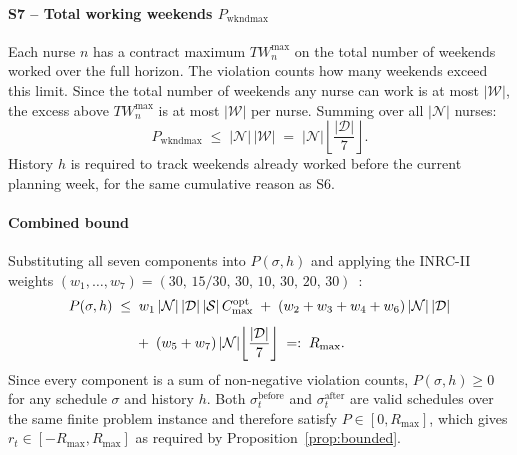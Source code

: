 \documentclass[11pt]{article}
\begin{document}
\paragraph{S7 -- Total working weekends $P_{\text{wkndmax}}$}

Each nurse $n$ has a contract maximum $TW^{\max}_n$ on the total
number of weekends worked over the full horizon. The violation counts
how many weekends exceed this limit. Since the total number of weekends
any nurse can work is at most $|\mathcal{W}|$, the excess above
$TW^{\max}_n$ is at most $|\mathcal{W}|$ per nurse. Summing over all
$|\mathcal{N}|$ nurses:
\[
  P_{\text{wkndmax}}
  \;\leq\;
  |\mathcal{N}|\,|\mathcal{W}|
  \;=\;
  |\mathcal{N}|\!\left\lfloor\frac{|\mathcal{D}|}{7}\right\rfloor.
\]
History $h$ is required to track weekends already worked before the
current planning week, for the same cumulative reason as S6.

\paragraph{Combined bound}

Substituting all seven components into $P(\sigma, h)$ and applying the
INRC-II weights $(w_1,\ldots,w_7) = (30,\,15/30,\,30,\,10,\,30,\,20,
\,30)$~\cite{ceschia2015inrc2}:
\begin{align}
  P(\sigma, h)
  \;\leq\;&\;
  w_1\,|\mathcal{N}|\,|\mathcal{D}|\,|\mathcal{S}|\,C^{\text{opt}}_{\max}
  \;+\;
  (w_2 + w_3 + w_4 + w_6)\,|\mathcal{N}|\,|\mathcal{D}|
  \notag\\[4pt]
  &+\;
  (w_5 + w_7)\,|\mathcal{N}|
  \!\left\lfloor\frac{|\mathcal{D}|}{7}\right\rfloor
  \;=:\; R_{\max}.
  \label{eq:rmax}
\end{align}
Since every component is a sum of non-negative violation counts,
$P(\sigma, h) \geq 0$ for any schedule $\sigma$ and history $h$.
Both $\sigma_t^{\text{before}}$ and $\sigma_t^{\text{after}}$ are
valid schedules over the same finite problem instance and therefore
satisfy $P \in [0, R_{\max}]$, which gives
$r_t \in [-R_{\max}, R_{\max}]$ as required by
Proposition~\ref{prop:bounded}.
\end{document}
